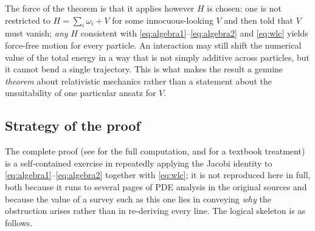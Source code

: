 \documentclass[11pt]{article}
\begin{document}
The force of the theorem is that it applies however $H$ is chosen: one is not restricted to $H=\sum_i\omega_i+V$ for some innocuous-looking $V$ and then told that $V$ must vanish; \emph{any} $H$ consistent with \eqref{eq:algebra1}--\eqref{eq:algebra2} and \eqref{eq:wlc} yields force-free motion for every particle. An interaction may still shift the numerical value of the total energy in a way that is not simply additive across particles, but it cannot bend a single trajectory. This is what makes the result a genuine \emph{theorem} about relativistic mechanics rather than a statement about the unsuitability of one particular ansatz for $V$.

\subsection{Strategy of the proof}

The complete proof (see \cite{Currie1963,CJS1963,Leutwyler1965} for the full computation, and \cite{SudarshanMukunda1974} for a textbook treatment) is a self-contained exercise in repeatedly applying the Jacobi identity to \eqref{eq:algebra1}--\eqref{eq:algebra2} together with \eqref{eq:wlc}; it is not reproduced here in full, both because it runs to several pages of PDE analysis in the original sources and because the value of a survey such as this one lies in conveying \emph{why} the obstruction arises rather than in re-deriving every line. The logical skeleton is as follows.
\end{document}
